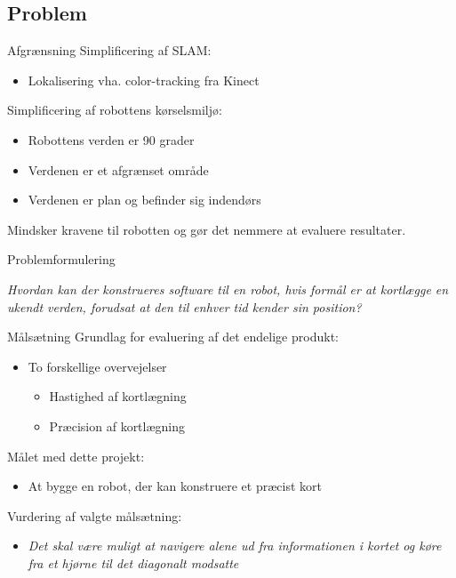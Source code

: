\subsection{Problem}
\begin{frame}[fragile]{Afgrænsning}
	Simplificering af SLAM:
	\begin{itemize}
		\item Lokalisering vha. color-tracking fra Kinect
	\end{itemize}
	
	\linespace
	\pause
	
	Simplificering af robottens kørselsmiljø:
	\begin{itemize}
		\item Robottens verden er 90 grader
		\item Verdenen er et afgrænset område
		\item Verdenen er plan og befinder sig indendørs
	\end{itemize}
	\linespace
	Mindsker kravene til robotten og gør det nemmere at evaluere resultater.
\end{frame}

\begin{frame}[fragile]{Problemformulering}
	\begin{center}
		\textit{Hvordan kan der konstrueres software til en robot, hvis formål er at kortlægge en ukendt verden, forudsat at den til enhver tid kender sin position?}
	\end{center}
\end{frame}

\begin{frame}[fragile]{Målsætning}
	Grundlag for evaluering af det endelige produkt:
	\begin{itemize}
	\item To forskellige overvejelser
		\begin{itemize}
			\item Hastighed af kortlægning
			\item Præcision af kortlægning
		\end{itemize}
	\end{itemize}
	\linespace
	\pause
	
	Målet med dette projekt:
	\begin{itemize}
		\item At bygge en robot, der kan konstruere et præcist kort
	\end{itemize}
	\linespace
	\pause
	
	Vurdering af valgte målsætning:
	\begin{itemize}
		\item \textit{Det skal være muligt at navigere alene ud fra informationen i kortet og køre fra et hjørne til det diagonalt modsatte}
	\end{itemize}
\end{frame}

